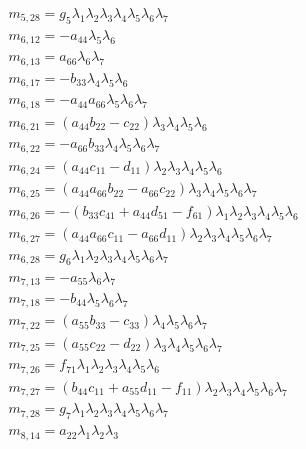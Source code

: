 \documentclass{article}
\begin{document}
\begin{align*}
&m_{5,28}=g_{5} \lambda_{1} \lambda_{2} \lambda_{3} \lambda_{4} \lambda_{5} \lambda_{6} \lambda_{7}\\
&m_{6,12}=-a_{44} \lambda_{5} \lambda_{6}\\
&m_{6,13}=a_{66} \lambda_{6} \lambda_{7}\\
&m_{6,17}=-b_{33} \lambda_{4} \lambda_{5} \lambda_{6}\\
&m_{6,18}=-a_{44} a_{66} \lambda_{5} \lambda_{6} \lambda_{7}\\
&m_{6,21}={\left(a_{44} b_{22} - c_{22}\right)} \lambda_{3} \lambda_{4} \lambda_{5} \lambda_{6}\\
&m_{6,22}=-a_{66} b_{33} \lambda_{4} \lambda_{5} \lambda_{6} \lambda_{7}\\
&m_{6,24}={\left(a_{44} c_{11} - d_{11}\right)} \lambda_{2} \lambda_{3} \lambda_{4} \lambda_{5} \lambda_{6}\\
&m_{6,25}={\left(a_{44} a_{66} b_{22} - a_{66} c_{22}\right)} \lambda_{3} \lambda_{4} \lambda_{5} \lambda_{6} \lambda_{7}\\
&m_{6,26}=-{\left(b_{33} c_{41} + a_{44} d_{51} - f_{61}\right)} \lambda_{1} \lambda_{2} \lambda_{3} \lambda_{4} \lambda_{5} \lambda_{6}\\
&m_{6,27}={\left(a_{44} a_{66} c_{11} - a_{66} d_{11}\right)} \lambda_{2} \lambda_{3} \lambda_{4} \lambda_{5} \lambda_{6} \lambda_{7}\\
&m_{6,28}=g_{6} \lambda_{1} \lambda_{2} \lambda_{3} \lambda_{4} \lambda_{5} \lambda_{6} \lambda_{7}\\
&m_{7,13}=-a_{55} \lambda_{6} \lambda_{7}\\
&m_{7,18}=-b_{44} \lambda_{5} \lambda_{6} \lambda_{7}\\
&m_{7,22}={\left(a_{55} b_{33} - c_{33}\right)} \lambda_{4} \lambda_{5} \lambda_{6} \lambda_{7}\\
&m_{7,25}={\left(a_{55} c_{22} - d_{22}\right)} \lambda_{3} \lambda_{4} \lambda_{5} \lambda_{6} \lambda_{7}\\
&m_{7,26}=f_{71} \lambda_{1} \lambda_{2} \lambda_{3} \lambda_{4} \lambda_{5} \lambda_{6}\\
&m_{7,27}={\left(b_{44} c_{11} + a_{55} d_{11} - f_{11}\right)} \lambda_{2} \lambda_{3} \lambda_{4} \lambda_{5} \lambda_{6} \lambda_{7}\\
&m_{7,28}=g_{7} \lambda_{1} \lambda_{2} \lambda_{3} \lambda_{4} \lambda_{5} \lambda_{6} \lambda_{7}\\
&m_{8,14}=a_{22} \lambda_{1} \lambda_{2} \lambda_{3}\\
\end{align*}
\end{document}
